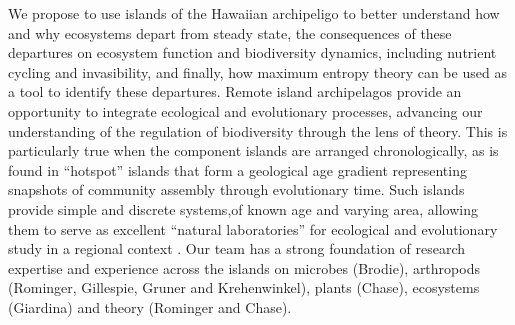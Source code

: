 \documentclass[11pt]{article}
\begin{document}
We propose to use islands of the Hawaiian archipeligo to better
understand how and why ecosystems depart from steady state, the
consequences of these departures on ecosystem function and
biodiversity dynamics, including nutrient cycling and invasibility,
and finally, how maximum entropy theory can be used as a tool to
identify these departures.  Remote island archipelagos provide an
opportunity to integrate ecological and evolutionary processes,
advancing our understanding of the regulation of biodiversity through
the lens of theory.  This is particularly true when the component
islands are arranged chronologically, as is found in ``hotspot''
islands that form a geological age gradient representing snapshots of
community assembly through evolutionary time. Such islands provide
simple and discrete systems,of known age and varying area, allowing
them to serve as excellent ``natural laboratories'' for ecological and
evolutionary study in a regional context \citep{simon1987,
  chadwick1999, gillespieClague2009}. Our team has a strong foundation
of research expertise and experience across the islands on microbes
(Brodie), arthropods (Rominger, Gillespie, Gruner and Krehenwinkel),
plants (Chase), ecosystems (Giardina) and theory (Rominger and Chase).
\end{document}
